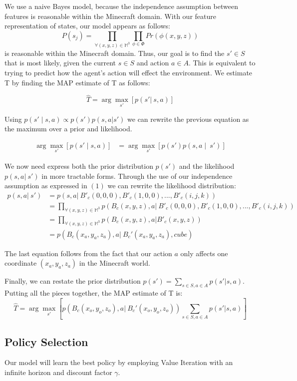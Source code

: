 \documentclass[a4paper]{article}
\begin{document}
We use a naive Bayes model, because the independence assumption between features is reasonable within the Minecraft domain. With our feature representation of states, our model appears as follows:
\[
    P(s_j) = \prod_{\forall (x, y, z) \in \mathbb{M}^3} \prod_{\phi \in \Phi} Pr(\phi(x,y,z))
    \tag{2}
\]
is reasonable within the Minecraft domain. Thus, our goal is to find the $s' \in S$ that is most likely, given the current $s \in S$ and action $a \in A$. This is equivalent to trying to predict how the agent's action will effect the environment. We estimate T by finding the MAP estimate of T as follows:

\[
\hat{T} = \arg\max_{s'} \left[p(s'|\ s,a)\right]
\tag{3}
\]

Using $p(s'\mid s,a) \propto p(s') p(s,a|s')$ we can rewrite the previous equation as the maximum over a prior and likelihood.

    \begin{align*}
\arg\max_{s'} \left[p(s'\mid s,a)\right] &= \arg\max_{s'} \left[p(s') p(s,a\mid\ s')\right]
\tag{4} 
\end{align*}


We now need express both the prior distribution $p(s')$ and the likelihood $p(s, a|\ s')$ in more tractable forms. Through the use of our independence assumption as expressed in $(1)$ we can rewrite the likelihood distribution:
\begin{align*}
    p(s, a |\ s') &= p(s, a |\ B'_c(0, 0, 0), B'_c(1, 0, 0), ..., B'_c(i, j, k))  \tag{5} \\
    &= \prod_{\forall (x, y, z) \in \mathbb{M}^3} p(B_c(x, y, z), a |\ B'_c(0, 0, 0), B'_c(1, 0, 0), ..., B'_c(i, j, k)) \tag{6} \\
    &= \prod_{\forall (x, y, z) \in \mathbb{M}^3} p(B_c(x, y, z), a | B'_c(x, y, z)) \tag{7} \\
    &= p(B_c(x_a, y_a, z_a), a |\ B_c'(x_a, y_a, z_a), cube) \tag{8} 
\end{align*}

The last equation follows from the fact that our action $a$ only affects one coordinate $(x_a, y_a, z_a)$ in the Minecraft world.

Finally, we can restate the prior distribution $p(s') = \sum_{s \in S, a \in A} p(s' | s,a)
$. Putting all the pieces together, the MAP estimate of T is:
\[
    \hat{T} = \arg \max_{s'} \left[ p(B_c(x_o, y_o, z_o), a |\ B_c'(x_o, y_o, z_o)) \sum_{s \in S, a \in A} p(s' | s, a) \right]
    \tag{9} 
\]

\subsection{Policy Selection}
Our model will learn the best policy by employing Value Iteration with an infinite horizon and discount factor $\gamma$.
\end{document}
